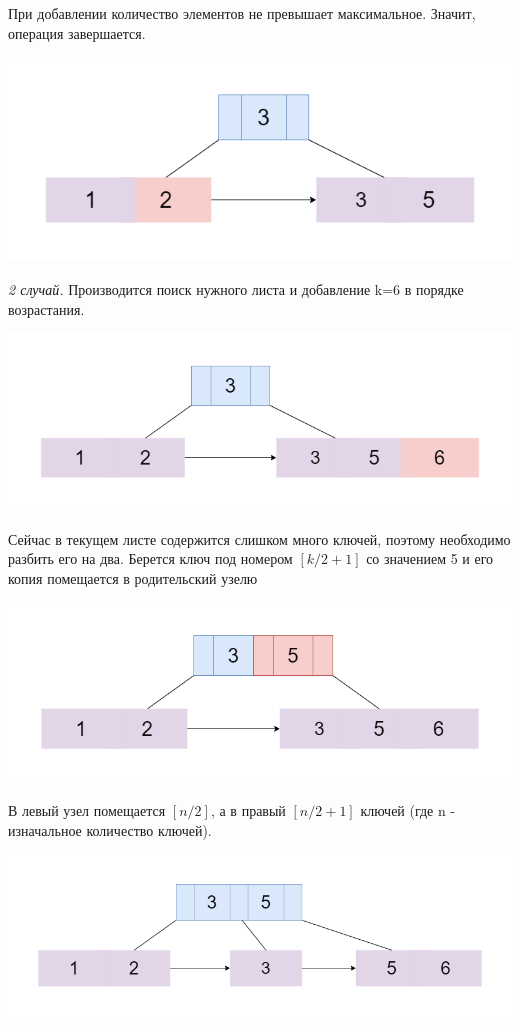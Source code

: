 \documentclass{article}
\begin{document}
При добавлении количество элементов не превышает максимальное. Значит, операция завершается.

\includegraphics[scale=0.4]{binsert2.png}

\textit{2 случай.} Производится поиск нужного листа и добавление k=6 в порядке возрастания.

\includegraphics[scale=0.4]{binsert21.png}

Сейчас в текущем листе содержится слишком много ключей, поэтому необходимо разбить его на два. Берется ключ под номером $[k/2+1]$ со значением 5 и его копия помещается в родительский узелю

\includegraphics[scale=0.4]{binsert22 (1).png}

В левый узел помещается $[n/2]$, а в правый $[n/2+1]$ ключей (где n - изначальное количество ключей).

\includegraphics[scale=0.4]{binsert23 (1).png}
\end{document}
